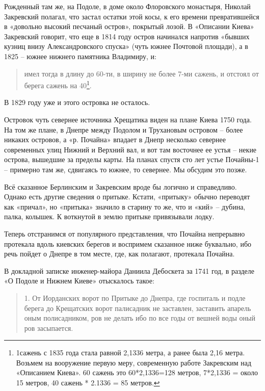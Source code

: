 Рожденный там же, на Подоле, в доме около Флоровского монастыря, Николай Закревский полагал, что застал остатки этой косы, к его времени превратившейся в «довольно высокий песчаный остров», покрытый лозой. В «Описании Киева»\cite{zakr01} Закревский говорит, что еще в 1814 году остров начинался напротив «бывших кузниц внизу Александровского спуска» (чуть южнее Почтовой площади), а в 1825 – южнее нижнего памятника Владимиру, и:

\begin{quotation}
имел тогда в длину до 60-ти, в ширину не более 7-ми сажень, и отстоял от берега сажень на 40\footnote{1сажень с 1835 года стала равной 2,1336 метра, а ранее была 2,16 метра. Возьмем на вооружение первую меру, современную работе Закревским над «Описанием Киева». 60 сажень это 60*2,1336=128 метров, 7*2,1336 = около 15 метров, 40 сажень * 2.1336 = 85 метров.}.
\end{quotation}

В 1829 году уже и этого островка не осталось.

Островок чуть севернее источника Хрещатика виден на плане Киева 1750 года. На том же плане, в Днепре между Подолом и Трухановым островом – более никаких островов, а «р. Почайна» впадает в Днепр несколько севернее современных улиц Нижний и Верхний вал, и вот там восточнее ее устья – некие острова, вышедшие за пределы карты. На планах спустя сто лет устье Почайны-1 – примерно там же, сдвигаясь то южнее, то севернее. Мы обсудим это позже.

Всё сказанное Берлинским и Закревским вроде бы логично и справедливо. Однако есть другие сведения о притыке. Кстати, «притыку» обычно переводят как «причал», но «притыка» значило в старину то же, что и «кий» – дубина, палка, колышек. К воткнутой в землю притыке привязывали лодку.

Теперь отстранимся от популярного представления, что Почайна непрерывно протекала вдоль киевских берегов и воспримем сказанное ниже буквально, ибо речь пойдет о Днепре в том месте, где, как полагают, протекала Почайна.

В докладной записке инженер-майора Даниила Дебоскета за 1741 год, в разделе «О Подоле и Нижнем Киеве» отыскалось такое:

\begin{quotation}
1. От Иорданских ворот по Притыке до Днепра, где госпиталь и подле берега до Крещатских ворот палисадник не заставлен, заставить апарель оным полисадником, ров не делать ибо по все годы от вешней воды оный ров засыпается.
\end{quotation}

